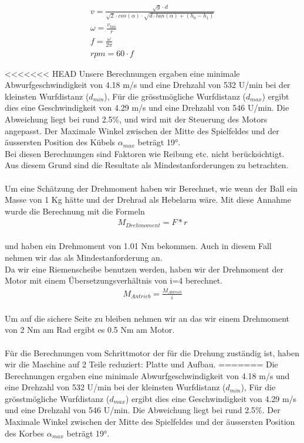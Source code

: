 \begin{gather}
	v=\frac{\sqrt{g} \cdot d}{\sqrt{2} \cdot cos(\alpha) \cdot \sqrt{d \cdot tan(\alpha)+(h_0-h_1)}}\\
	\omega=\frac{v_{tan}}{r}\\
	f=\frac{\omega}{2\pi}\\
	rpm=60 \cdot f
\end{gather}

<<<<<<< HEAD
Unsere Berechnungen ergaben eine minimale Abwurfgeschwindigkeit von 4.18 m/s und eine Drehzahl von 532 U/min bei der kleinsten Wurfdistanz ($d_{min}$), 
Für die grösstmögliche Wurfdistanz ($d_{max}$) ergibt dies  eine Geschwindigkeit von 4.29 m/s und eine Drehzahl von 546 U/min. 
Die Abweichung liegt bei rund 2.5\%, und wird mit der Steuerung des Motors angepasst.
Der Maximale Winkel zwischen der Mitte des Spielfeldes und der äussersten Position des Kübels $\alpha_{max}$ beträgt 19°. \\
Bei diesen Berechnungen sind Faktoren wie Reibung etc. nicht berücksichtigt. Aus diesem Grund sind die Resultate als Mindestanforderungen zu betrachten.\\ \\
Um eine Schätzung der Drehmoment haben wir Berechnet, wie wenn der Ball ein Masse von 1 Kg hätte und der Drehrad als Hebelarm wäre. Mit diese Annahme wurde die Berechnung mit die Formeln\\
\begin{gather}
	M_{Drehmoment}=F*r
\end{gather}\\
und haben ein Drehmoment von 1.01 Nm bekommen. Auch in diesem Fall nehmen wir das als Mindestanforderung an.\\
Da wir eine Riemenscheibe benutzen werden, haben wir der Drehmoment der Motor mit einem Übersetzungsverhältnis von i=4 berechnet.\\
\begin{gather}
	M_{Antrieb}=\frac{M_{Abtrieb}}{i}
\end{gather}\\
Um auf die sichere Seite zu bleiben nehmen wir an das wir einem Drehmoment von 2 Nm am Rad ergibt es 0.5 Nm am Motor.\\ \\
Für die Berechnungen vom Schrittmotor der für die Drehung zuständig ist, haben wir die Maschine auf 2 Teile reduziert: Platte und Aufbau.
=======
Die Berechnungen ergaben eine minimale Abwurfgeschwindigkeit von 4.18 m/s und eine Drehzahl von 532 U/min bei der kleinsten Wurfdistanz ($d_{min}$), 
Für die grösstmögliche Wurfdistanz ($d_{max}$) ergibt dies eine Geschwindigkeit von 4.29 m/s und eine Drehzahl von 546 U/min. 
Die Abweichung liegt bei rund 2.5\%.
Der Maximale Winkel zwischen der Mitte des Spielfeldes und der äussersten Position des Korbes $\alpha_{max}$ beträgt 19°.

